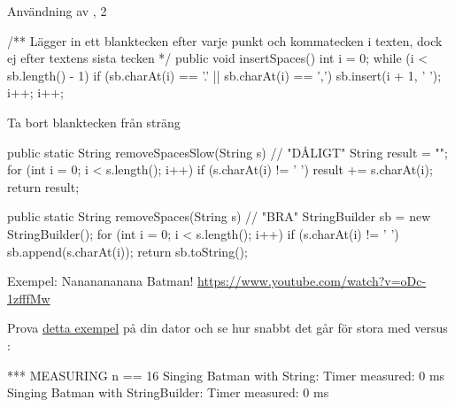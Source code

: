 \documentclass{lecturenotes}
\begin{document}
\begin{Slide}{Användning av , 2}
\begin{Code}
/** Lägger in ett blanktecken efter varje punkt och kommatecken 
    i texten, dock ej efter textens sista tecken */
public void insertSpaces() {
    int i = 0;
    while (i < sb.length() - 1) {
        if (sb.charAt(i) == '.' || sb.charAt(i) == ',') {
            sb.insert(i + 1, ' ');
            i++;
        }
        i++;
    }
}
\end{Code}
\end{Slide} 

\begin{Slide}{Ta bort blanktecken från sträng}

\begin{Code}
public static String removeSpacesSlow(String s) { // "DÅLIGT"
    String result = "";
    for (int i = 0; i < s.length(); i++) {
        if (s.charAt(i) != ' ') {
            result += s.charAt(i);
        }
    }
    return result;
}

public static String removeSpaces(String s) { // "BRA"
    StringBuilder sb = new StringBuilder();
    for (int i = 0; i < s.length(); i++) {
        if (s.charAt(i) != ' ') {
            sb.append(s.charAt(i));
        }
    }
    return sb.toString();
}
\end{Code}
\end{Slide} 

\begin{Slide}{Exempel: Nananananana Batman!}
\url{https://www.youtube.com/watch?v=oDc-1zfffMw} \\ \vspace{1em}

Prova \href{https://github.com/bjornregnell/lth-eda016-2015/blob/master/lectures/examples/eclipse-ws/lecture-examples/src/week05/NanananananananaNanananananananaBatman.java}{detta exempel} på din dator och se hur snabbt det går för stora  med  versus :
\begin{Code}
*** MEASURING n == 16
  Singing Batman with String:        Timer measured: 0 ms
  Singing Batman with StringBuilder: Timer measured: 0 ms
\end{Code}
\end{Slide} 
\end{document}

